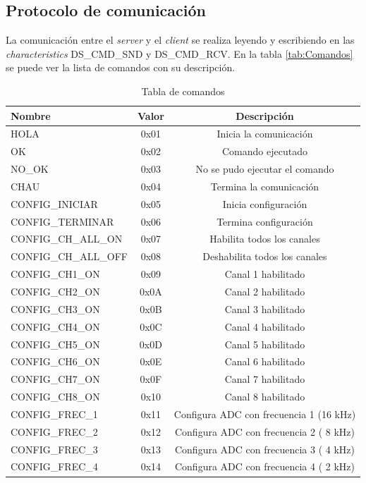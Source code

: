 \subsection{Protocolo de comunicación}
La comunicación entre el \textit{server} y el \textit{client} se realiza leyendo y escribiendo en las \textit{characteristics} DS\_CMD\_SND y DS\_CMD\_RCV. En la tabla \ref{tab:Comandos} se puede ver la lista de comandos con su descripción.
\begin{table}[h]
\centering
\caption[Tabla de comandos]{Tabla de comandos}
\begin{tabular}{l c c}
\toprule
\textbf{Nombre} & \textbf{Valor} & \textbf{Descripción}\\
\midrule
HOLA				&	0x01	&	Inicia la comunicación\\  
OK             	&	0x02	&	Comando ejecutado \\
NO\_OK    		&	0x03	&	No se pudo ejecutar el comando\\
CHAU    			&	0x04	&	Termina la comunicación\\
CONFIG\_INICIAR	&	0x05	&	Inicia configuración\\
CONFIG\_TERMINAR	&	0x06	&	Termina configuración\\
CONFIG\_CH\_ALL\_ON	& 	0x07	&	Habilita todos los canales\\
CONFIG\_CH\_ALL\_OFF &	0x08	&	Deshabilita todos los canales\\
CONFIG\_CH1\_ON    &	0x09	&	Canal 1 habilitado\\
CONFIG\_CH2\_ON    &	0x0A	&	Canal 2 habilitado\\
CONFIG\_CH3\_ON    &	0x0B	&	Canal 3 habilitado\\
CONFIG\_CH4\_ON    &	0x0C	&	Canal 4 habilitado\\
CONFIG\_CH5\_ON    &	0x0D	&	Canal 5 habilitado\\
CONFIG\_CH6\_ON    &	0x0E	&	Canal 6 habilitado\\
CONFIG\_CH7\_ON    &	0x0F	&	Canal 7 habilitado\\
CONFIG\_CH8\_ON    &	0x10	&	Canal 8 habilitado\\
CONFIG\_FREC\_1    &	0x11	&	Configura ADC con frecuencia 1 (16 kHz)\\
CONFIG\_FREC\_2    &	0x12	&	Configura ADC con frecuencia 2 ( 8 kHz)\\
CONFIG\_FREC\_3    &	0x13	&	Configura ADC con frecuencia 3 ( 4 kHz)\\
CONFIG\_FREC\_4    &	0x14	&	Configura ADC con frecuencia 4 ( 2 kHz)\\

\end{tabular}
\end{table}
